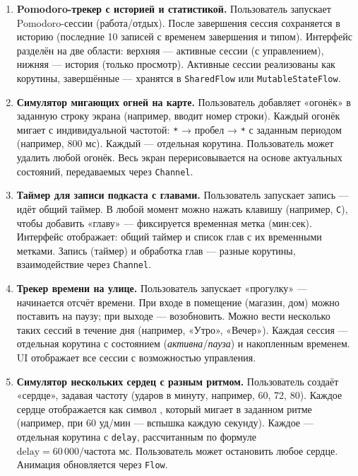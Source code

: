 \begin{enumerate}
\item[20]
\textbf{Pomodoro-трекер с историей и статистикой.} Пользователь запускает Pomodoro-сессии (работа/отдых). После завершения сессия сохраняется в историю (последние 10 записей с временем завершения и типом). Интерфейс разделён на две области: верхняя — активные сессии (с управлением), нижняя — история (только просмотр). Активные сессии реализованы как корутины, завершённые — хранятся в \texttt{SharedFlow} или \texttt{MutableStateFlow}.

\item[21]
\textbf{Симулятор мигающих огней на карте.} Пользователь добавляет «огонёк» в заданную строку экрана (например, вводит номер строки). Каждый огонёк мигает с индивидуальной частотой: \texttt{*} → пробел → \texttt{*} с заданным периодом (например, 800 мс). Каждый — отдельная корутина. Пользователь может удалить любой огонёк. Весь экран перерисовывается на основе актуальных состояний, передаваемых через \texttt{Channel}.

\item[22]
\textbf{Таймер для записи подкаста с главами.} Пользователь запускает запись — идёт общий таймер. В любой момент можно нажать клавишу (например, \texttt{C}), чтобы добавить «главу» — фиксируется временная метка (мин:сек). Интерфейс отображает: общий таймер и список глав с их временными метками. Запись (таймер) и обработка глав — разные корутины, взаимодействие через \texttt{Channel}.

\item[23]
\textbf{Трекер времени на улице.} Пользователь запускает «прогулку» — начинается отсчёт времени. При входе в помещение (магазин, дом) можно поставить на паузу; при выходе — возобновить. Можно вести несколько таких сессий в течение дня (например, «Утро», «Вечер»). Каждая сессия — отдельная корутина с состоянием (\textit{активна}/\textit{пауза}) и накопленным временем. UI отображает все сессии с возможностью управления.

\item[24]
\textbf{Симулятор нескольких сердец с разным ритмом.} Пользователь создаёт «сердце», 
задавая частоту (ударов в минуту, например, 60, 72, 80). 
Каждое сердце отображается как символ \texttt{\Heart}, который мигает в заданном ритме
 (например, при 60 уд/мин — вспышка каждую секунду). Каждое — отдельная корутина с \texttt{delay}, 
 рассчитанным по формуле $ \text{delay} = 60\,000 / \text{частота} $ мс. 
 Пользователь может остановить любое сердце. Анимация обновляется через \texttt{Flow}.


\end{enumerate}
